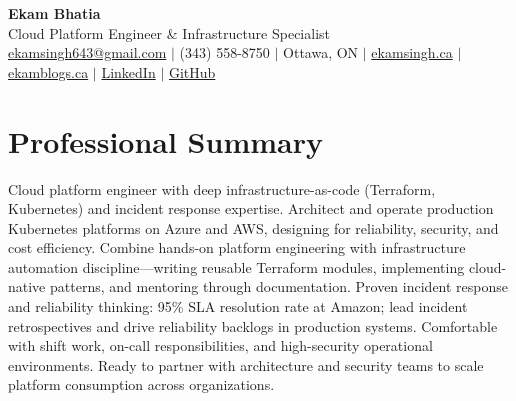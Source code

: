 \documentclass[11pt,a4paper]{article}
\begin{document}
\begin{center}
    {\LARGE \textbf{Ekam Bhatia}} \\
    \vspace{2pt}
    {\normalsize Cloud Platform Engineer \& Infrastructure Specialist } \\
    \vspace{4pt}
    \small
    \href{mailto:ekamsingh643@gmail.com}{ekamsingh643@gmail.com} $|$
    (343) 558-8750 $|$ Ottawa, ON $|$
    \href{https://www.ekamsingh.ca}{ekamsingh.ca} $|$
    \href{https://www.ekamblogs.ca}{ekamblogs.ca} $|$
    \href{https://www.linkedin.com/in/ekam-bhatia-335840168}{LinkedIn} $|$
    \href{https://github.com/bhat0155}{GitHub}
\end{center}

\section{Professional Summary}
Cloud platform engineer with deep infrastructure-as-code (Terraform, Kubernetes) and incident response expertise. Architect and operate production Kubernetes platforms on Azure and AWS, designing for reliability, security, and cost efficiency. Combine hands-on platform engineering with infrastructure automation discipline—writing reusable Terraform modules, implementing cloud-native patterns, and mentoring through documentation. Proven incident response and reliability thinking: 95\% SLA resolution rate at Amazon; lead incident retrospectives and drive reliability backlogs in production systems. Comfortable with shift work, on-call responsibilities, and high-security operational environments. Ready to partner with architecture and security teams to scale platform consumption across organizations.

\end{document}

